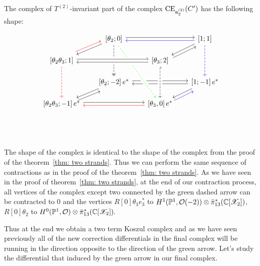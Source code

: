 The complex  of $T^{(2)}$-invariant part of the complex $\mathrm{CE}_{\mathfrak{n}_2^{(2)}}(C')$ has the following shape:


$$
\begin{tikzcd}[row sep=scriptsize, column sep=scriptsize]
&\left[ \theta_2;0\right]\arrow[dl] \arrow[rr,shift left=0.5ex] \arrow[dd, dashed, two heads] & & \left[1;1\right] \arrow[dl] \arrow[dd, dashed,blue]\arrow[ll,shift left=0.5ex,blue] \\
\left[\theta_2\theta_3;1\right]\arrow[ur, shift left=1ex,red]  \arrow[dd, dashed, red] & & \left[\theta_3;2\right] \arrow[ur,shift right=1ex]\\
& \left[\theta_2;-2\right] e^* \arrow[dl] \arrow[rr, shift left=0.5ex] &  & \left[1;-1\right] e^* \arrow[dl]\arrow[ll, shift left=0.5ex] \\
\left[\theta_2\theta_3;-1\right]e^* \arrow[ur,shift right=1ex] \arrow[rr, shift left=0.5ex] & & \left[\theta_3,0\right]e^*\arrow[ur, shift right=1ex, blue]
\arrow[ll, shift left=0.5ex,red]\\
\arrow[to=4-3, from=2-3, crossing over, dashed, hook]\\
\arrow[to=4-3, from=1-2, dashed, crossing over,green]
\arrow[from=2-1, to=2-3, shift left=0.5ex,crossing over]
\arrow[to=2-1, from=2-3, shift left=0.5ex,crossing over]
\end{tikzcd}
$$



The shape of the complex is identical to the shape of the complex from the proof of the theorem~\ref{thm: two strands}. Thus we can perform the same sequence of contractions as in the proof of
the theorem~\ref{thm: two strands}. As we have seen in the proof of theorem~\ref{thm: two strands},
at the end of our contraction process, all vertices of the complex except two connected by the green dashed arrow can be contracted to $0$ and the vertices $R[0]\theta_3 e_3^*$ to $H^1(\mathbb{P}^1,\mathcal{O}(-2))\otimes \bar{\pi}_{13}^*(\mathbb{C}[\mathscr{X}_2])$,
$R[0]\theta_2$ to $H^0(\mathbb{P}^1,\mathcal{O})\otimes \bar{\pi}_{13}^*(\mathbb{C}[\mathscr{X}_2]).$

Thus at the end we obtain a two term Koszul complex and as we have seen previously all of the new correction differentials
in the final complex will be running in the direction opposite to the direction of the green arrow. Let's study the differential that induced by the green arrow in our final complex.



